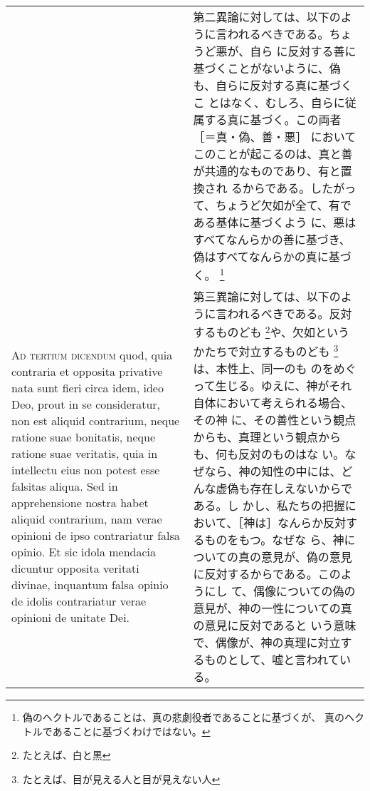 \documentclass[paper=a4paper,fontsize=10pt,jafontsize=9pt,titlepage]{jlreq}
\begin{document}
\begin{longtable}{p{21em}p{21em}}
&

第二異論に対しては、以下のように言われるべきである。ちょうど悪が、自ら
に反対する善に基づくことがないように、偽も、自らに反対する真に基づくこ
とはなく、むしろ、自らに従属する真に基づく。この両者［＝真・偽、善・悪］
においてこのことが起こるのは、真と善が共通的なものであり、有と置換され
るからである。したがって、ちょうど欠如が全て、有である基体に基づくよう
に、悪はすべてなんらかの善に基づき、偽はすべてなんらかの真に基づく。
\footnote{偽のヘクトルであることは、真の悲劇役者であることに基づくが、
真のヘクトルであることに基づくわけではない。}

\\


{\scshape Ad tertium dicendum} quod, quia contraria et opposita
 privative nata sunt fieri circa idem, ideo Deo, prout in se
 consideratur, non est aliquid contrarium, neque ratione suae
 bonitatis, neque ratione suae veritatis, quia in intellectu eius non
 potest esse falsitas aliqua. Sed in apprehensione nostra habet
 aliquid contrarium, nam verae opinioni de ipso contrariatur falsa
 opinio. Et sic idola mendacia dicuntur opposita veritati divinae,
 inquantum falsa opinio de idolis contrariatur verae opinioni de
 unitate Dei.

&

第三異論に対しては、以下のように言われるべきである。反対するものども
\footnote{たとえば、白と黒}や、欠如というかたちで対立するものども
\footnote{たとえば、目が見える人と目が見えない人}は、本性上、同一のも
のをめぐって生じる。ゆえに、神がそれ自体において考えられる場合、その神
に、その善性という観点からも、真理という観点からも、何も反対のものはな
い。なぜなら、神の知性の中には、どんな虚偽も存在しえないからである。し
かし、私たちの把握において、［神は］なんらか反対するものをもつ。なぜな
ら、神についての真の意見が、偽の意見に反対するからである。このようにし
て、偶像についての偽の意見が、神の一性についての真の意見に反対であると
いう意味で、偶像が、神の真理に対立するものとして、嘘と言われている。

\end{longtable}
\end{document}
